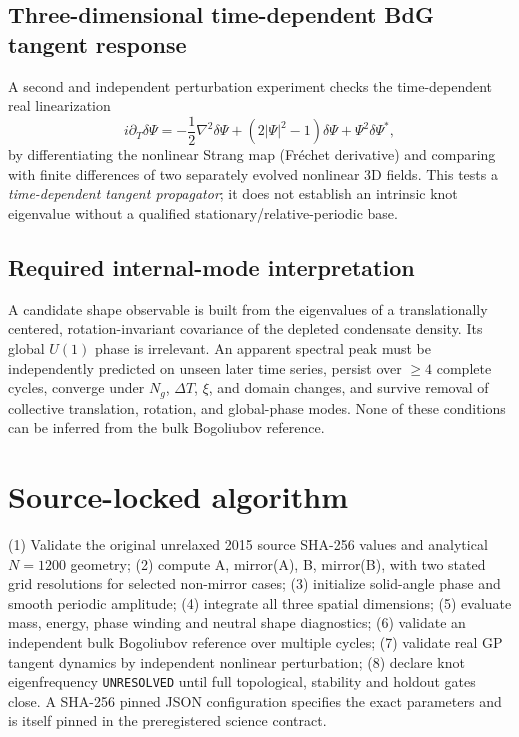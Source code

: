\documentclass[10pt,a4paper]{article}
\begin{document}
\subsection{Three-dimensional time-dependent BdG tangent response}
A second and independent perturbation experiment checks the time-dependent real linearization
\begin{equation}
 i\partial_T\delta\Psi=-\frac12\nabla^2\delta\Psi+(2|\Psi|^2-1)\delta\Psi+\Psi^2\delta\Psi^*,
\end{equation}
by differentiating the nonlinear Strang map (Fr\'{e}chet derivative) and comparing with finite differences of two separately evolved nonlinear 3D fields. This tests a \emph{time-dependent tangent propagator}; it does not establish an intrinsic knot eigenvalue without a qualified stationary/relative-periodic base.

\subsection{Required internal-mode interpretation}
A candidate shape observable is built from the eigenvalues of a translationally centered, rotation-invariant covariance of the depleted condensate density. Its global $U(1)$ phase is irrelevant. An apparent spectral peak must be independently predicted on unseen later time series, persist over $\ge4$ complete cycles, converge under $N_g$, $\Delta T$, $\xi$, and domain changes, and survive removal of collective translation, rotation, and global-phase modes. None of these conditions can be inferred from the bulk Bogoliubov reference.
\section{Source-locked algorithm}
(1) Validate the original unrelaxed 2015 source SHA-256 values and analytical $N=1200$ geometry; (2) compute A, mirror(A), B, mirror(B), with two stated grid resolutions for selected non-mirror cases; (3) initialize solid-angle phase and smooth periodic amplitude; (4) integrate all three spatial dimensions; (5) evaluate mass, energy, phase winding and neutral shape diagnostics; (6) validate an independent bulk Bogoliubov reference over multiple cycles; (7) validate real GP tangent dynamics by independent nonlinear perturbation; (8) declare knot eigenfrequency \texttt{UNRESOLVED} until full topological, stability and holdout gates close. A SHA-256 pinned JSON configuration specifies the exact parameters and is itself pinned in the preregistered science contract.
\end{document}
